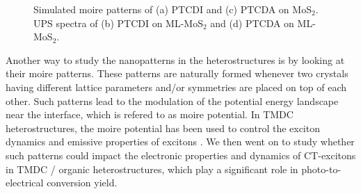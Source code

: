 \documentclass[12pt]{article}
\begin{document}
\begin{figure}[H]
\caption{Simulated moire patterns of (a) PTCDI and (c) PTCDA on MoS$_2$. UPS spectra of (b) PTCDI on ML-MoS$_2$ and (d) PTCDA on ML-MoS$_2$.}\label{fig:Moire}
\end{figure}
Another way to study the nanopatterns in the heterostructures is by looking at their moire patterns. These patterns are naturally formed whenever two crystals having different lattice parameters and/or symmetries are placed on top of each other. Such patterns lead to the modulation of the potential energy landscape near the interface, which is refered to as moire potential. In TMDC heterostructures, the moire potential has been used to control the exciton dynamics and emissive properties of excitons \cite{yuan2020twist,bai2020excitons,seyler2019signatures}. We then went on to study whether such patterns could impact the electronic properties and dynamics of CT-excitons in TMDC / organic heterostructures, which play a significant role in photo-to-electrical conversion yield.

\vspace{7pt}
\end{document}
